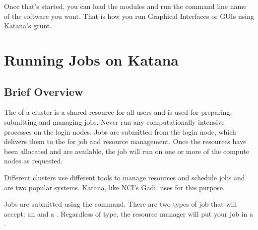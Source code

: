 \documentclass[letterpaper,10pt,english]{sphinxmanual}
\begin{document}
\noindent{}

Once that’s started, you can load the modules and run the command line name of the software you want. That is how you run Graphical Interfaces or GUIs using Katana’s grunt.

\noindent{}


\section{Running Jobs on Katana}
\label{\detokenize{using_katana/running_jobs:running-jobs-on-katana}}\label{\detokenize{using_katana/running_jobs:running-jobs}}\label{\detokenize{using_katana/running_jobs::doc}}

\subsection{Brief Overview}
\label{\detokenize{using_katana/running_jobs:brief-overview}}
The {\hyperref[\detokenize{glossary:term-Login-Node}]{}} of a cluster is a shared resource for all users and is used for preparing, submitting and managing jobs. Never run any computationally intensive processes on the login nodes. Jobs are submitted from the login node, which delivers them to the {\hyperref[\detokenize{glossary:term-Head-Node}]{}} for job and resource management. Once the resources have been allocated and are available, the job will run on one or more of the compute nodes as requested.

Different clusters use different tools to manage resources and schedule jobs \sphinxhyphen{}  and  are two popular systems. Katana, like NCI’s Gadi, uses  for this purpose.

Jobs are submitted using the  command. There are two types of job that  will accept: an {\hyperref[\detokenize{glossary:term-Interactive-Job}]{}} and a {\hyperref[\detokenize{glossary:term-Batch-Job}]{}}. Regardless of type, the resource manager will put your job in a {\hyperref[\detokenize{glossary:term-Queue}]{}}.
\end{document}
